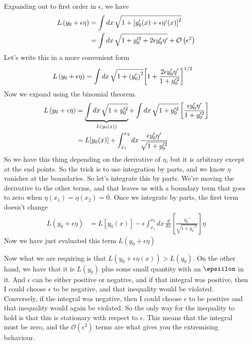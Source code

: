 Expanding out to first order in $\epsilon$,
we have
\begin{align}
    L\left( y_0 + \epsilon\eta \right)
    &=
    \int dx\,
    \sqrt{1 + {\left[ y_0'(x) + \epsilon\eta'(x) \right]}^2}\\
    &=
    \int dx\,
    \sqrt{%
        1 + y_0'^2 + 2\epsilon y_0' \eta'
    }
    + \mathcal{O}\left( \epsilon^2 \right)
\end{align}
Let's write this in a more convenient form
\begin{align}
    L\left( y_0 + \epsilon \eta \right) &=
    \int dx\, \sqrt{%
        1 + {\left( y_0' \right)}^2
    }
    {\left[
        1 + \frac{2\epsilon y_0' \eta'}{1 + y_0'^2}
    \right]}^{1/2}
\end{align}
Now we expand using the binomial theorem.
\begin{align}
    L\left( y_0 + \epsilon \eta \right) &=
    \underbrace{%
        \int dx\, \sqrt{%
            1 + y_0'^2
        }
    }_{L(y_0(x))}
    +
    \int dx\,
    \sqrt{1 + y_0'^2}\left[ 
        \frac{\epsilon y_0' \eta'}{1 + y_0'^2}
    \right]\\
    &=
    L[y_0(x)]
    +
    \int_{x_1}^{x_2} dx\,
    \frac{\epsilon y_0' \eta'}{\sqrt{1 + y_0'^2}}
\end{align}
So we have this thing depending on the derivative of $\eta$,
but it is arbitrary except at the end points.
So the trick is to use integration by parts,
and we know $\eta$ vanishes at the boundaries.
So let's integrate this by parts.
We're moving the derivative to the other terms,
and that leaves us with a boundary term that goes to zero when
$\eta(x_1)=\eta(x_2)=0$.
Once we integrate by parts,
the first term doesn't change
\begin{align}
    L\left( y_0 + \epsilon \eta \right) &=
    L[y_0(x)]
    -
    \epsilon
    \int_{x_1}^{x_2} dx\,
    \frac{d}{dx}\left[ 
    \frac{y_0'}{\sqrt{1 + y_0'^2}}
    \right]\eta
\end{align}
Now we have just evaluated this term
$L\left( y_0 + \epsilon \eta \right)$

Now what we are requiring is that
$L\left( y_0 + \epsilon\eta(x) \right) > L(y_0)$.
On the other hand,
we have that it is $L(y_0)$ plus some small quantity with an $\epsiilon$
in it.
And $\epsilon$ can be either positive or negative,
and if that integral was positive,
then I could choose $\epsilon$ to be negative,
and that inequality would be violated.
Conversely,
if the integral was negative,
then I could choose $\epsilon$ to be positive
and that inequality would again be violated.
So the only way for the inequality to hold is that this is stationary with
respect to $\epsilon$.
This means that the integral must be zero,
and the $\mathcal{O}\left( \epsilon^2 \right)$
terms are what gives you the extremising behaviour.

